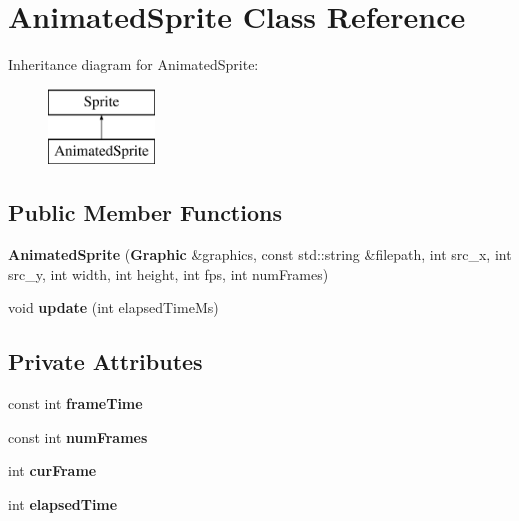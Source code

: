 \section{Animated\+Sprite Class Reference}
\label{class_animated_sprite}
Inheritance diagram for Animated\+Sprite\+:\begin{figure}[H]
\begin{center}
\leavevmode
\includegraphics[height=2.000000cm]{class_animated_sprite}
\end{center}
\end{figure}
\subsection*{Public Member Functions}
\begin{DoxyCompactItemize}
\item 
{\bfseries Animated\+Sprite} ({\bf Graphic} \&graphics, const std\+::string \&filepath, int src\+\_\+x, int src\+\_\+y, int width, int height, int fps, int num\+Frames)\label{class_animated_sprite_a2a1f34b3a8a73610e7ab0a8d741af37c}

\item 
void {\bfseries update} (int elapsed\+Time\+Ms)\label{class_animated_sprite_a18757c4843c4022bd1a021e5679ba072}

\end{DoxyCompactItemize}
\subsection*{Private Attributes}
\begin{DoxyCompactItemize}
\item 
const int {\bfseries frame\+Time}\label{class_animated_sprite_a5d2761b7b834c5b0e8f8e96702c4f45b}

\item 
const int {\bfseries num\+Frames}\label{class_animated_sprite_ac89d280976ff63f8cdaf50c6c4dcf640}

\item 
int {\bfseries cur\+Frame}\label{class_animated_sprite_a02d0ef997b93c7376ebdeffd0e6cd061}

\item 
int {\bfseries elapsed\+Time}\label{class_animated_sprite_a3c653a3497872da461b83dfcc3dac040}

\end{DoxyCompactItemize}
